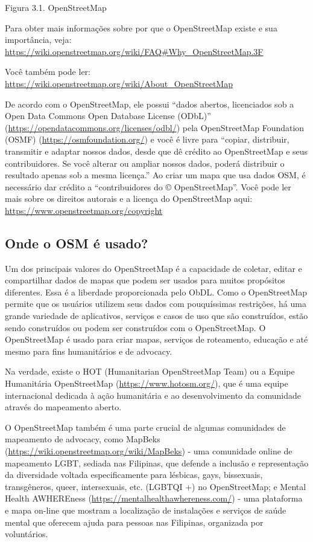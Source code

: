 \documentclass[
]{krantz}
\begin{document}
Figura 3.1. OpenStreetMap

Para obter mais informações sobre por que o OpenStreetMap existe e sua importância, veja: \href{https://wiki.openstreetmap.org/wiki/FAQ\#Why_OpenStreetMap\%20.3F}{https://wiki.openstreetmap.org/wiki/FAQ\#Why\_OpenStreetMap.3F}

Você também pode ler: \url{https://wiki.openstreetmap.org/wiki/About_OpenStreetMap}

De acordo com o OpenStreetMap, ele possui ``dados abertos, licenciados sob a Open Data Commons Open Database License (ODbL)'' (\url{https://opendatacommons.org/licenses/odbl/}) pela OpenStreetMap Foundation (OSMF) (\url{https://osmfoundation.org/}) e você é livre para ``copiar, distribuir, transmitir e adaptar nossos dados, desde que dê crédito ao OpenStreetMap e seus contribuidores. Se você alterar ou ampliar nossos dados, poderá distribuir o resultado apenas sob a mesma licença.'' Ao criar um mapa que usa dados OSM, é necessário dar crédito a ``contribuidores do © OpenStreetMap''. Você pode ler mais sobre os direitos autorais e a licença do OpenStreetMap aqui: \url{https://www.openstreetmap.org/copyright}

\hypertarget{onde-o-osm-uxe9-usado}{%
\subsection{Onde o OSM é usado?}\label{onde-o-osm-uxe9-usado}}

Um dos principais valores do OpenStreetMap é a capacidade de coletar, editar e compartilhar dados de mapas que podem ser usados para muitos propósitos diferentes. Essa é a liberdade proporcionada pelo ObDL. Como o OpenStreetMap permite que os usuários utilizem seus dados com pouquíssimas restrições, há uma grande variedade de aplicativos, serviços e casos de uso que são construídos, estão sendo construídos ou podem ser construídos com o OpenStreetMap. O OpenStreetMap é usado para criar mapas, serviços de roteamento, educação e até mesmo para fins humanitários e de advocacy.

Na verdade, existe o HOT (Humanitarian OpenStreetMap Team) ou a Equipe Humanitária OpenStreetMap (\url{https://www.hotosm.org/}), que é uma equipe internacional dedicada à ação humanitária e ao desenvolvimento da comunidade através do mapeamento aberto.

O OpenStreetMap também é uma parte crucial de algumas comunidades de mapeamento de advocacy, como MapBeks (\url{https://wiki.openstreetmap.org/wiki/MapBeks}) - uma comunidade online de mapeamento LGBT, sediada nas Filipinas, que defende a inclusão e representação da diversidade voltada especificamente para lésbicas, gays, bissexuais, transgêneros, queer, intersexuais, etc. (LGBTQI +) no OpenStreetMap; e Mental Health AWHEREness (\url{https://mentalhealthawhereness.com/}) - uma plataforma e mapa on-line que mostram a localização de instalações e serviços de saúde mental que oferecem ajuda para pessoas nas Filipinas, organizada por voluntários.
\end{document}
